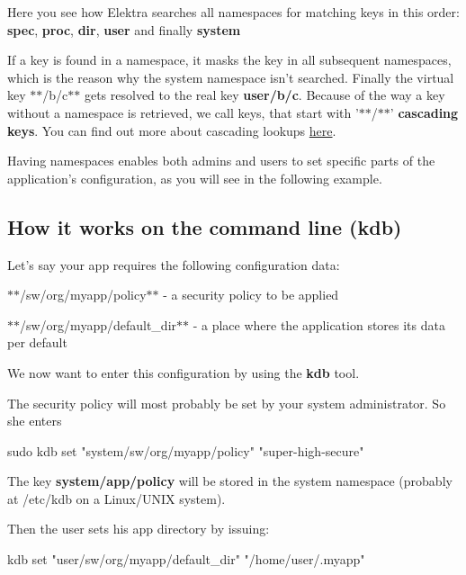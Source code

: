 Here you see how Elektra searches all namespaces for matching keys in this order\+: {\bfseries spec}, {\bfseries proc}, {\bfseries dir}, {\bfseries user} and finally {\bfseries system}

If a key is found in a namespace, it masks the key in all subsequent namespaces, which is the reason why the system namespace isn't searched. Finally the virtual key $\ast$$\ast$/b/c$\ast$$\ast$ gets resolved to the real key {\bfseries user/b/c}. Because of the way a key without a namespace is retrieved, we call keys, that start with '$\ast$$\ast$/$\ast$$\ast$' {\bfseries cascading keys}. You can find out more about cascading lookups \hyperlink{doc_tutorials_cascading_md}{here}.

Having namespaces enables both admins and users to set specific parts of the application's configuration, as you will see in the following example.

\subsection*{How it works on the command line (kdb)}

Let's say your app requires the following configuration data\+:


\begin{DoxyItemize}
\item $\ast$$\ast$/sw/org/myapp/policy$\ast$$\ast$ -\/ a security policy to be applied
\item $\ast$$\ast$/sw/org/myapp/default\+\_\+dir$\ast$$\ast$ -\/ a place where the application stores its data per default
\end{DoxyItemize}

We now want to enter this configuration by using the {\bfseries kdb} tool.

The security policy will most probably be set by your system administrator. So she enters \begin{DoxyVerb}    sudo kdb set "system/sw/org/myapp/policy" "super-high-secure"
\end{DoxyVerb}


The key {\bfseries system/app/policy} will be stored in the system namespace (probably at /etc/kdb on a Linux/\+U\+N\+I\+X system).

Then the user sets his app directory by issuing\+: \begin{DoxyVerb}    kdb set "user/sw/org/myapp/default_dir" "/home/user/.myapp"
\end{DoxyVerb}


